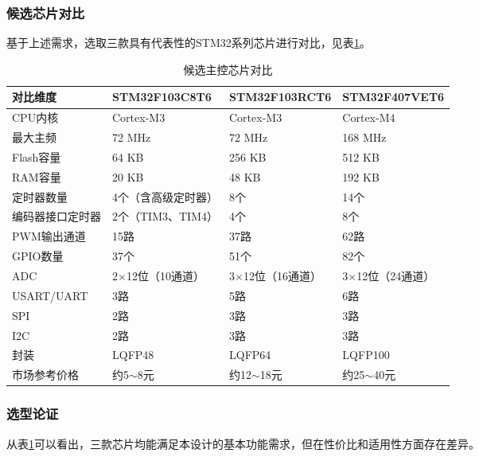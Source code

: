 {{{        \subsubsection{候选芯片对比}

        基于上述需求，选取三款具有代表性的STM32系列芯片进行对比，见表\ref{tab:mcu_compare}。

        \begin{table}[htbp]
        \wuhao
        \centering
        \caption{候选主控芯片对比}
        \label{tab:mcu_compare}
        \begin{tabular}{p{2.4cm}p{2.8cm}p{2.8cm}p{2.8cm}}
        \toprule
        对比维度 & STM32F103C8T6 & STM32F103RCT6 & STM32F407VET6 \\
        \midrule
        CPU内核 & Cortex-M3 & Cortex-M3 & Cortex-M4 \\
        最大主频 & 72 MHz & 72 MHz & 168 MHz \\
        Flash容量 & 64 KB & 256 KB & 512 KB \\
        RAM容量 & 20 KB & 48 KB & 192 KB \\
        定时器数量 & 4个（含高级定时器） & 8个 & 14个 \\
        编码器接口定时器 & 2个（TIM3、TIM4） & 4个 & 8个 \\
        PWM输出通道 & 15路 & 37路 & 62路 \\
        GPIO数量 & 37个 & 51个 & 82个 \\
        ADC & 2$\times$12位（10通道） & 3$\times$12位（16通道） & 3$\times$12位（24通道） \\
        USART/UART & 3路 & 5路 & 6路 \\
        SPI & 2路 & 3路 & 3路 \\
        I2C & 2路 & 3路 & 3路 \\
        封装 & LQFP48 & LQFP64 & LQFP100 \\
        市场参考价格 & 约5$\sim$8元 & 约12$\sim$18元 & 约25$\sim$40元 \\
        \bottomrule
        \end{tabular}
        \end{table}

        \subsubsection{选型论证}

        从表\ref{tab:mcu_compare}可以看出，三款芯片均能满足本设计的基本功能需求，但在性价比和适用性方面存在差异。

}}}
